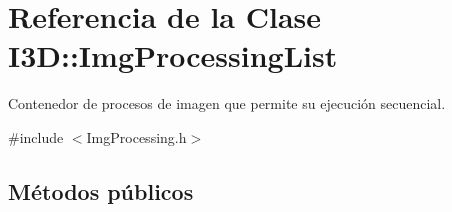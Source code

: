 \hypertarget{class_i3_d_1_1_img_processing_list}{}\section{Referencia de la Clase I3D\+:\+:Img\+Processing\+List}
\label{class_i3_d_1_1_img_processing_list}


Contenedor de procesos de imagen que permite su ejecución secuencial.  




{\ttfamily \#include $<$Img\+Processing.\+h$>$}

\subsection*{Métodos públicos}
